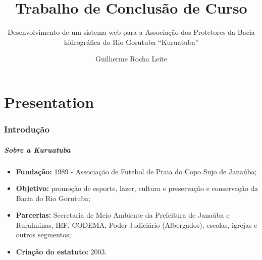 \documentclass{beamer}
\title[Trabalho de Conclusão de Curso]{Trabalho de Conclusão de Curso}
\subtitle{Desenvolvimento de um sistema web para a Associação dos Protetores da Bacia hidrográfica do Rio Gorutuba ``Kuruatuba''}
\author[Guilherme Rocha Leite]{Guilherme Rocha Leite}
\institute[UFVJM]{Universidade Federal dos Vales do Jequitinhonha e Mucuri \newline
  Bacharelado em Sistemas de Informação \newline
	  
     Orientador: Prof.ª Erinaldo Barbosa da Silva\\
     Co-orientador: Thales Francisco Mota Carvalho\\
     $~$\\
}
\begin{document}
\frame{\titlepage}

\part{Presentation}




\section{Introdução}

\begin{frame}
    \frametitle{Sobre a Kuruatuba}
    \begin{itemize}
        \item \textbf{Fundação:} 1989 - Associação de Futebol de Praia do Copo Sujo de Janaúba;
        \item \textbf{Objetivo:} promoção de esporte, lazer, cultura e preservação e conservação da Bacia do Rio Gorutuba;
        \item \textbf{Parcerias:} Secretaria de Meio Ambiente da Prefeitura de Janaúba e Ruralminas, IEF, CODEMA, Poder Judiciário (Albergados), escolas, igrejas e outros segmentos;
        \item \textbf{Criação do estatuto:} 2003.
    \end{itemize}

\end{frame}
\end{document}
